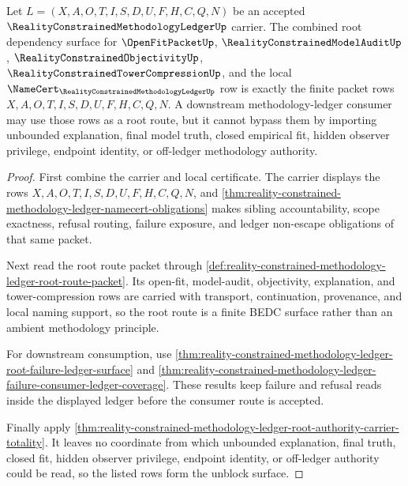 \begin{theorem}
\label{thm:reality-constrained-methodology-ledger-namecert-unblock-surface}
Let $L=(X,A,O,T,I,S,D,U,F,H,C,Q,N)$ be an accepted $\RealityConstrainedMethodologyLedgerUp$ carrier. The combined root dependency surface for $\OpenFitPacketUp$, $\RealityConstrainedModelAuditUp$, $\RealityConstrainedObjectivityUp$, $\RealityConstrainedTowerCompressionUp$, and the local $\NameCert_{\RealityConstrainedMethodologyLedgerUp}$ row is exactly the finite packet rows $X,A,O,T,I,S,D,U,F,H,C,Q,N$. A downstream methodology-ledger consumer may use those rows as a root route, but it cannot bypass them by importing unbounded explanation, final model truth, closed empirical fit, hidden observer privilege, endpoint identity, or off-ledger methodology authority.
\end{theorem}
\begin{proof}
First combine the carrier and local certificate. The carrier displays the rows $X,A,O,T,I,S,D,U,F,H,C,Q,N$, and \autoref{thm:reality-constrained-methodology-ledger-namecert-obligations} makes sibling accountability, scope exactness, refusal routing, failure exposure, and ledger non-escape obligations of that same packet.

Next read the root route packet through \autoref{def:reality-constrained-methodology-ledger-root-route-packet}. Its open-fit, model-audit, objectivity, explanation, and tower-compression rows are carried with transport, continuation, provenance, and local naming support, so the root route is a finite BEDC surface rather than an ambient methodology principle.

For downstream consumption, use \autoref{thm:reality-constrained-methodology-ledger-root-failure-ledger-surface} and \autoref{thm:reality-constrained-methodology-ledger-failure-consumer-ledger-coverage}. These results keep failure and refusal reads inside the displayed ledger before the consumer route is accepted.

Finally apply \autoref{thm:reality-constrained-methodology-ledger-root-authority-carrier-totality}. It leaves no coordinate from which unbounded explanation, final truth, closed fit, hidden observer privilege, endpoint identity, or off-ledger authority could be read, so the listed rows form the unblock surface.
\end{proof}
